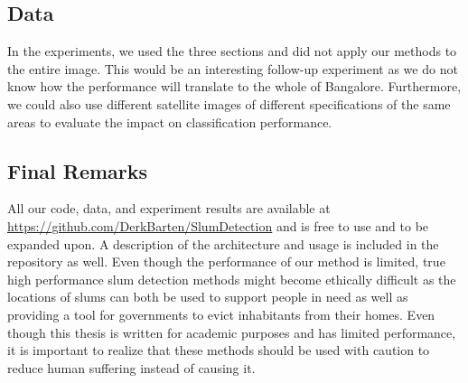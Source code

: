 \subsection{Data}
In the experiments, we used the three sections and did not apply our methods to the entire image. This would be an interesting follow-up experiment as we do not know how the performance will translate to the whole of Bangalore. Furthermore, we could also use different satellite images of different specifications of the same areas to evaluate the impact on classification performance.


\subsection{Final Remarks}
All our code, data, and experiment results are available at \url{https://github.com/DerkBarten/SlumDetection} and is free to use and to be expanded upon. A description of the architecture and usage is included in the repository as well. Even though the performance of our method is limited, true high performance slum detection methods might become ethically difficult as the locations of slums can both be used to support people in need as well as providing a tool for governments to evict inhabitants from their homes. Even though this thesis is written for academic purposes and has limited performance, it is important to realize that these methods should be used with caution to reduce human suffering instead of causing it.









